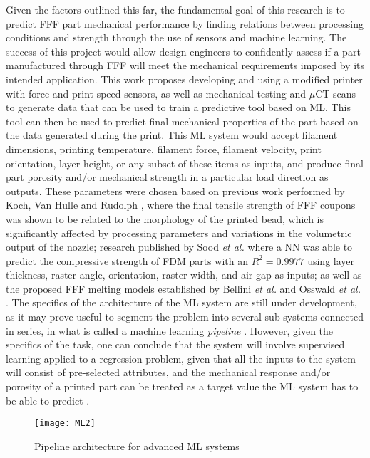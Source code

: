 \documentclass[main.tex]{subfiles}
\begin{document}
Given the factors outlined this far, the fundamental goal of this research is to predict FFF part mechanical performance by finding relations between processing conditions and strength through the use of sensors and machine learning. The success of this project would allow design engineers to confidently assess if a part manufactured through FFF will meet the mechanical requirements imposed by its intended application. This work proposes developing and using a modified printer with force and print speed sensors, as well as mechanical testing and $\mu$CT scans to generate data that can be used to train a predictive tool based on ML. This tool can then be used to predict final mechanical properties of the part based on the data generated during the print. This ML system would accept filament dimensions, printing temperature, filament force, filament velocity, print orientation, layer height, or any subset of these items as inputs, and produce final part porosity and/or mechanical strength in a particular load direction as outputs. These parameters were chosen based on previous work performed by Koch, Van Hulle and Rudolph \cite{Koch2017}, where the final tensile strength of FFF coupons was shown to be related to the morphology of the printed bead, which is significantly affected by processing parameters and variations in the volumetric output of the nozzle; research published by Sood \emph{et al.} \cite{Sood2012} where a NN was able to predict the compressive strength of FDM parts with an $R^2= 0.9977$ using layer thickness, raster angle, orientation, raster width, and air gap as inputs; as well as the proposed FFF melting models established by Bellini \emph{et al.} \cite{Bellini2004} and Osswald \emph{et al.} \cite{OsswaldMelting18}. The specifics of the architecture of the ML system are still under development, as it may prove useful to segment the problem into several sub-systems connected in series, in what is called a machine learning \emph{pipeline} \cite{Geron2019}. However, given the specifics of the task, one can conclude that the system will involve supervised learning applied to a regression problem, given that all the inputs to the system will consist of pre-selected attributes, and the mechanical response and/or porosity of a printed part can be treated as a target value the ML system has to be able to predict \cite{Mohammed2017, Meng2020}.

\begin{figure}[!htbp]
	\center
	\texttt{[image: ML2]}
	\caption{Pipeline architecture for advanced ML systems \cite{Geron2019}} \label{fig:pipeline}
\end{figure}
\end{document}

